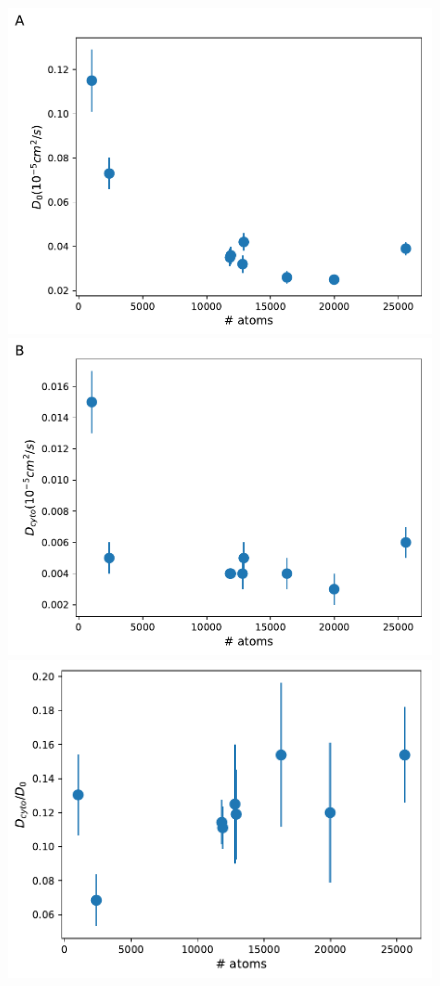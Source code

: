 \documentclass[journal=jacsat,manuscript=article]{achemso}
\begin{document}
\begin{figure}
\includegraphics[scale=0.5]{diff_singles.pdf} \\
\includegraphics[scale=0.5]{diff_cyto.pdf} \\
\includegraphics[scale=0.5]{diff_cyto_over_singles.pdf}

\end{figure}
\end{document}
